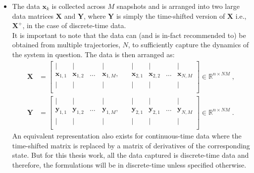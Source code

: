 \begin{itemize}
    \item The data $\mathbf{x}_k$ is collected across $M$ snapshots and is arranged into two large data matrices $\mathbf{X}$ and $\mathbf{Y}$, where $\mathbf{Y}$ is simply the time-shifted version of $\mathbf{X}$ i.e., $\mathbf{X^+}$, in the case of discrete-time data.\\
    It is important to note that the data can (and is in-fact recommended to) be obtained from multiple trajectories, ${N}$, to sufficiently capture the dynamics of the system in question. The data is then arranged as:
    \begin{align}
    \label{data1}
        \mathbf{X} &= \begin{bmatrix}
        |                  & |                  & \quad & |                  & \quad     |            &   |               &       &         |         \\
        \mathbf{x}_{1,1}   & \mathbf{x}_{1,2}   & \dots & \mathbf{x}_{1,M}, & \quad \mathbf{x}_{2,1} & \mathbf{x}_{2,2} & \dots & \mathbf{x}_{N,M}\\
        |                  & |                  & \quad & |                  & \quad    |               & |                 &       & |                   \\
        \end{bmatrix} \in \mathbb{R}^{n\times NM}  \;, \\
        \label{data2}
        \mathbf{Y}  &= \begin{bmatrix}
        |                  & |                  & \quad & |                  & \quad     |            &   |               &       &         |         \\
        \mathbf{y}_{1,1}   & \mathbf{y}_{1,2}   & \dots &  \mathbf{y}_{1,M},   & \quad  \mathbf{y}_{2,1} & \mathbf{y}_{2,1} & \dots & \mathbf{y}_{N,M} \\
        |                  & |                  & \quad & |                  & \quad     |            &   |               &       &         |         \\
        \end{bmatrix} \in \mathbb{R}^{n\times NM} \;.
    \end{align}
    An equivalent representation also exists for continuous-time data where the time-shifted matrix is replaced by a matrix of derivatives of the corresponding state. But for this thesis work, all the data captured is discrete-time data and therefore, the formulations will be in discrete-time unless specified otherwise. \\

\end{itemize}
